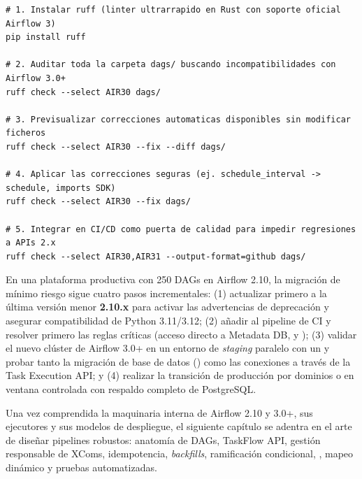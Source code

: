\begin{lstlisting}[style=bash, caption={Auditoría y refactorización asistida de DAGs de Airflow 2.10 hacia Airflow 3.0+ mediante \texttt{ruff} y las reglas \texttt{AIR30}.}, label={lst:ruff-air30}]
# 1. Instalar ruff (linter ultrarrapido en Rust con soporte oficial Airflow 3)
pip install ruff

# 2. Auditar toda la carpeta dags/ buscando incompatibilidades con Airflow 3.0+
ruff check --select AIR30 dags/

# 3. Previsualizar correcciones automaticas disponibles sin modificar ficheros
ruff check --select AIR30 --fix --diff dags/

# 4. Aplicar las correcciones seguras (ej. schedule_interval -> schedule, imports SDK)
ruff check --select AIR30 --fix dags/

# 5. Integrar en CI/CD como puerta de calidad para impedir regresiones a APIs 2.x
ruff check --select AIR30,AIR31 --output-format=github dags/
\end{lstlisting}

\begin{examplebox}
En una plataforma productiva con 250 DAGs en Airflow 2.10, la migración de mínimo riesgo sigue cuatro pasos incrementales: (1) actualizar primero a la última versión menor \textbf{2.10.x} para activar las advertencias de deprecación y asegurar compatibilidad de Python 3.11/3.12; (2) añadir  al pipeline de CI y resolver primero las reglas críticas (acceso directo a Metadata DB,  y ); (3) validar el nuevo clúster de Airflow 3.0+ en un entorno de \textit{staging} paralelo con un  y probar tanto la migración de base de datos () como las conexiones a través de la Task Execution API; y (4) realizar la transición de producción por dominios o en ventana controlada con respaldo completo de PostgreSQL.
\end{examplebox}

Una vez comprendida la maquinaria interna de Airflow 2.10 y 3.0+, sus ejecutores y sus modelos de despliegue, el siguiente capítulo se adentra en el arte de diseñar pipelines robustos: anatomía de DAGs, TaskFlow API, gestión responsable de XComs, idempotencia, \textit{backfills}, ramificación condicional, , mapeo dinámico y pruebas automatizadas.
